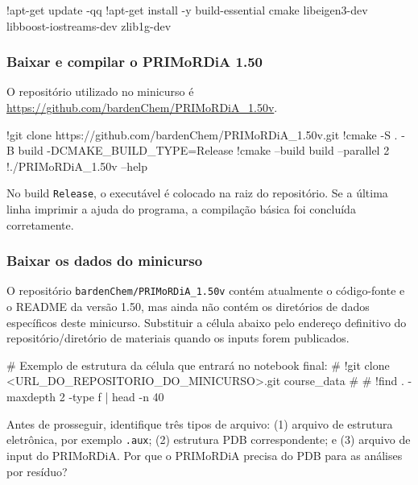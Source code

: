 \documentclass[a4paper,11pt]{refart}
\newcommand{\code}[1]{\texttt{#1}}
\begin{document}
\begin{shell}
!apt-get update -qq
!apt-get install -y build-essential cmake libeigen3-dev libboost-iostreams-dev zlib1g-dev
\end{shell}

\subsubsection{Baixar e compilar o PRIMoRDiA 1.50}

O repositório utilizado no minicurso é \url{https://github.com/bardenChem/PRIMoRDiA_1.50v}.

\begin{shell}
!git clone https://github.com/bardenChem/PRIMoRDiA_1.50v.git
!cmake -S . -B build -DCMAKE_BUILD_TYPE=Release
!cmake --build build --parallel 2
!./PRIMoRDiA_1.50v --help
\end{shell}

No build \code{Release}, o executável é colocado na raiz do repositório. Se a última linha imprimir a ajuda do programa, a compilação básica foi concluída corretamente.

\subsubsection{Baixar os dados do minicurso}

\begin{todobox}
O repositório \code{bardenChem/PRIMoRDiA\_1.50v} contém atualmente o código-fonte e o README da versão 1.50, mas ainda não contém os diretórios de dados específicos deste minicurso. Substituir a célula abaixo pelo endereço definitivo do repositório/diretório de materiais quando os inputs forem publicados.
\end{todobox}

\begin{shell}
# Exemplo de estrutura da célula que entrará no notebook final:
# !git clone <URL_DO_REPOSITORIO_DO_MINICURSO>.git course_data
# %
# !find . -maxdepth 2 -type f | head -n 40
\end{shell}

\begin{interpretacaobox}
Antes de prosseguir, identifique três tipos de arquivo: (1) arquivo de estrutura eletrônica, por exemplo \code{.aux}; (2) estrutura PDB correspondente; e (3) arquivo de input do PRIMoRDiA. Por que o PRIMoRDiA precisa do PDB para as análises por resíduo?
\end{interpretacaobox}
\end{document}
